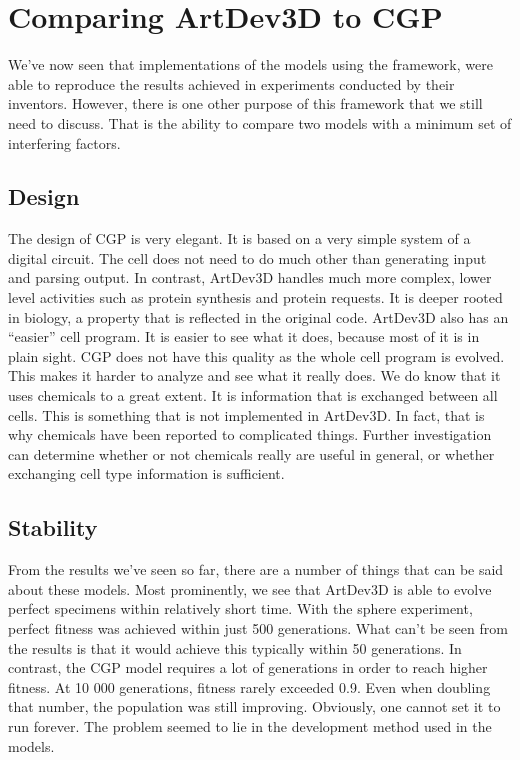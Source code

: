 \section{Comparing ArtDev3D to CGP}
We've now seen that implementations of the models using the framework, were able to reproduce the results achieved in experiments conducted by their inventors. However, there is one other purpose of this framework that we still need to discuss. That is the ability to compare two models with a minimum set of interfering factors.


\subsection{Design}
The design of CGP is very elegant. It is based on a very simple system of a digital circuit. The cell does not need to do much other than generating input and parsing output. In contrast, ArtDev3D handles much more complex, lower level activities such as protein synthesis and protein requests. It is deeper rooted in biology, a property that is reflected in the original code. ArtDev3D also has an ``easier'' cell program. It is easier to see what it does, because most of it is in plain sight. CGP does not have this quality as the whole cell program is evolved. This makes it harder to analyze and see what it really does. We do know that it uses chemicals to a great extent. It is information that is exchanged between all cells. This is something that is not implemented in ArtDev3D. In fact, that is why chemicals have been reported\cite{hoye2006} to complicated things. Further investigation can determine whether or not chemicals really are useful in general, or whether exchanging cell type information is sufficient.


\subsection{Stability}
From the results we've seen so far, there are a number of things that can be said about these models. Most prominently, we see that ArtDev3D is able to evolve perfect specimens within relatively short time. With the sphere experiment, perfect fitness was achieved within just 500 generations. What can't be seen from the results is that it would achieve this typically within 50 generations. In contrast, the CGP model requires a lot of generations in order to reach higher fitness. At 10 000 generations, fitness rarely exceeded 0.9. Even when doubling that number, the population was still improving. Obviously, one cannot set it to run forever. The problem seemed to lie in the development method used in the models.

